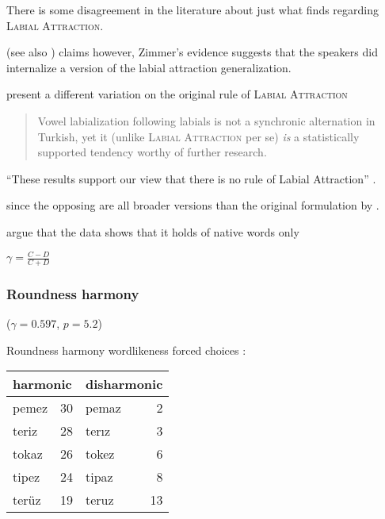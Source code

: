 
There is some disagreement in the literature about just what \citet{Zimmer1969} finds regarding \textsc{Labial Attraction}.

\citet{Zimmer1969}
(see also \citet[][4]{Zuraw2000})
claims however, Zimmer's evidence suggests that the speakers did internalize a version of the labial attraction generalization.

\citet{Inkelas2001} present a different variation on the original rule of \textsc{Labial Attraction}

\begin{quotation}
Vowel labialization following labials is not a synchronic alternation in Turkish, yet it (unlike \textsc{Labial Attraction} per se) \emph{is} a statistically supported tendency worthy of further research. \citep[][196, emphasis in original]{Inkelas2001}
\end{quotation}

``These results support our view that there is no rule of Labial Attraction'' \citep[][225]{Clements1982}.

since the opposing are all broader versions than the original formulation by \citeauthor{Lees1966a}.

\citet{Ito1993} argue that the data shows that it holds of native words only

\citet{Goodman1954}

\ex $\displaystyle \gamma = \frac{C - D}{C + D}$ \xe

\subsubsection{Roundness harmony}

($\gamma = 0.597$, $p = 5.2$) 

Roundness harmony wordlikeness forced choices \citep[314]{Zimmer1969}: \vspace{6pt} \\ 
\begin{tabular}{l r l r}
\toprule
\multicolumn{2}{l}{harmonic} & \multicolumn{2}{l}{disharmonic} \\
\midrule
pemez & 30                   & pemaz & 2 \\
teriz & 28                   & terız & 3 \\
tokaz & 26                   & tokez & 6 \\
tipez & 24                   & tipaz & 8 \\
terüz & 19                   & teruz & 13 \\
\bottomrule
\end{tabular}

